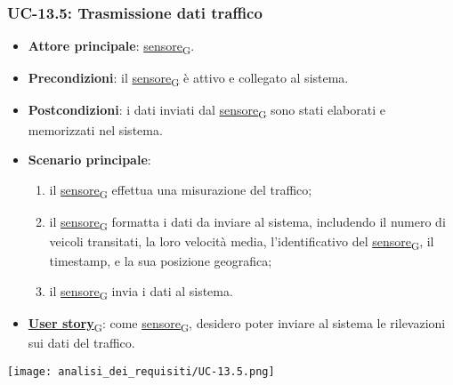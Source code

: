 \subsubsection{UC-13.5: Trasmissione dati traffico}
\begin{itemize}
	\item \textbf{Attore principale}: \href{https://7last.github.io/docs/pb/documentazione-interna/glossario\#sensore}{sensore\textsubscript{G}}.
	\item \textbf{Precondizioni}: il \href{https://7last.github.io/docs/pb/documentazione-interna/glossario\#sensore}{sensore\textsubscript{G}} è attivo e collegato al sistema.
	\item \textbf{Postcondizioni}: i dati inviati dal \href{https://7last.github.io/docs/pb/documentazione-interna/glossario\#sensore}{sensore\textsubscript{G}} sono stati elaborati e memorizzati nel sistema.
	\item \textbf{Scenario principale}:
	      \begin{enumerate}
		      \item il \href{https://7last.github.io/docs/pb/documentazione-interna/glossario\#sensore}{sensore\textsubscript{G}} effettua una misurazione del traffico;
		      \item il \href{https://7last.github.io/docs/pb/documentazione-interna/glossario\#sensore}{sensore\textsubscript{G}} formatta i dati da inviare al sistema, includendo il numero di veicoli transitati, la loro velocità media, l'identificativo del \href{https://7last.github.io/docs/pb/documentazione-interna/glossario\#sensore}{sensore\textsubscript{G}},
		            il timestamp, e la sua posizione geografica;
		      \item il \href{https://7last.github.io/docs/pb/documentazione-interna/glossario\#sensore}{sensore\textsubscript{G}} invia i dati al sistema.
	      \end{enumerate}
	\item \href{https://7last.github.io/docs/pb/documentazione-interna/glossario\#user-story}{\textbf{User story}\textsubscript{G}}:
	      come \href{https://7last.github.io/docs/pb/documentazione-interna/glossario\#sensore}{sensore\textsubscript{G}}, desidero poter inviare al sistema le rilevazioni sui dati del traffico.
\end{itemize}

\begin{center}
	\texttt{[image: analisi\_dei\_requisiti/UC-13.5.png]}
\end{center}

